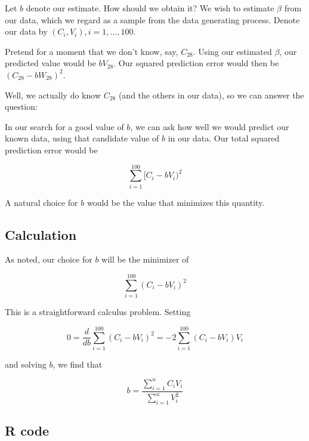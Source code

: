 \documentclass[
  letterpaper,
  DIV=11,
  numbers=noendperiod,
  oneside]{scrreprt}
\begin{document}
{} Let \(b\)
denote our estimate. How should we obtain it? We wish to estimate
\(\beta\) from our data, which we regard as a sample from the data
generating process. Denote our data by \((C_i,V_i), i = 1,...,100\).

Pretend for a moment that we don't know, say, \(C_{28}\). Using our
estimated \(\beta\), our predicted value would be \(b V_{28}\). Our
squared prediction error would then be \((C_{28} - b W_{28})^2\).

Well, we actually do know \(C_{28}\) (and the others in our data), so we
can answer the question:

In our search for a good value of \(b\), we can ask how well we would
predict our known data, using that candidate value of \(b\) in our data.
Our total squared prediction error would be

\[
\sum_{i=1}^{100} [C_{i} - b V_{i} )^2
\]

A natural choice for \(b\) would be the value that minimizes this
quantity. {}

\hypertarget{calculation}{%
\subsection{Calculation}\label{calculation}}

As noted, our choice for \(b\) will be the minimizer of

\[
\sum_{i=1}^{100} (C_{i} - b V_{i})^2
\]

This is a straightforward calculus problem. Setting

\[
0 = \frac{d}{db} \sum_{i=1}^{100} (C_{i} - b V_{i} )^2 =
-2 \sum_{i=1}^{100} (C_{i} - b V_{i}) V_i
\]

and solving \(b\), we find that

\[
b = \frac{\sum_{i=1}^n C_i V_i}{\sum_{i=1}^nV_i^2}
\]

\hypertarget{r-code}{%
\subsection{R code}\label{r-code}}
\end{document}
